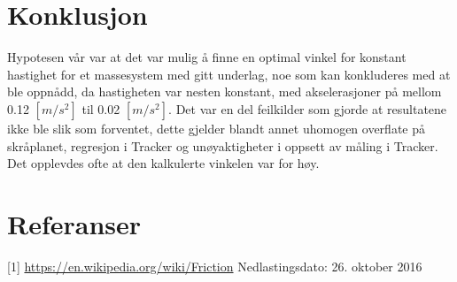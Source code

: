 \documentclass[10pt,a4paper]{report}
\begin{document}
{\let\clearpage\relax\chapter*{Konklusjon}}
Hypotesen vår var at det var mulig å finne en optimal vinkel for konstant hastighet for et massesystem med gitt underlag, noe som kan konkluderes med at ble oppnådd, da hastigheten var nesten konstant, med akselerasjoner på mellom 0.12 $[m/s^2]$ til 0.02 $[m/s^2]$. Det var en del feilkilder som gjorde at resultatene ikke ble slik som forventet, dette gjelder blandt annet uhomogen overflate på skråplanet, regresjon i Tracker og unøyaktigheter i oppsett av måling i Tracker. Det opplevdes ofte at den kalkulerte vinkelen var for høy.

\chapter*{Referanser}
[1] \href{url}{https://en.wikipedia.org/wiki/Friction}
Nedlastingsdato: 26. oktober 2016
\end{document}
